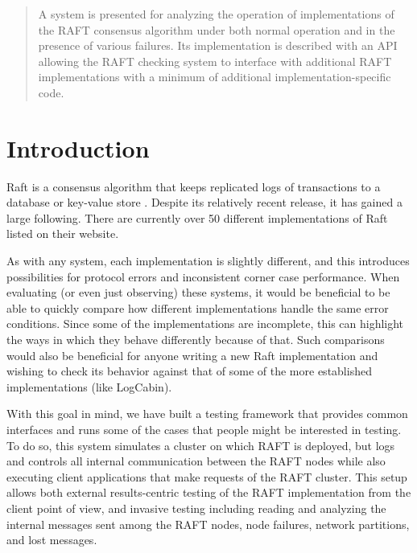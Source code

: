 \documentclass[UTF8]{article}
\begin{document}
 

\setlength\parindent{24pt}

\begin{abstract}
	
A system is presented for analyzing the operation of implementations of the RAFT consensus algorithm under both normal operation and in the presence of various failures. Its implementation is described with an API allowing the RAFT checking system to interface with additional RAFT implementations with a minimum of additional implementation-specific code.

\end{abstract} 

\section{Introduction}

Raft is a consensus algorithm that keeps replicated logs of transactions to a database or key-value store \cite{raftPaper}. Despite its relatively recent release, it has gained a large following. There are currently over 50 different implementations of Raft listed on their website.
 
As with any system, each implementation is slightly different, and this introduces possibilities for protocol errors and inconsistent corner case performance. When evaluating (or even just observing) these systems, it would be beneficial to be able to quickly compare how different implementations handle the same error conditions. Since some of the implementations are incomplete, this can highlight the ways in which they behave differently because of that. Such comparisons would also be beneficial for anyone writing a new Raft implementation and wishing to check its behavior against that of some of the more established implementations (like LogCabin). 

With this goal in mind, we have built a testing framework that provides common interfaces and runs some of the cases that people might be interested in testing. To do so, this system simulates a cluster on which RAFT is deployed, but logs and controls all internal communication between the RAFT nodes while also executing client applications that make requests of the RAFT cluster. This setup allows both external results-centric testing of the RAFT implementation from the client point of view, and invasive testing including reading and analyzing the internal messages sent among the RAFT nodes, node failures, network partitions, and lost messages.
\end{document}
